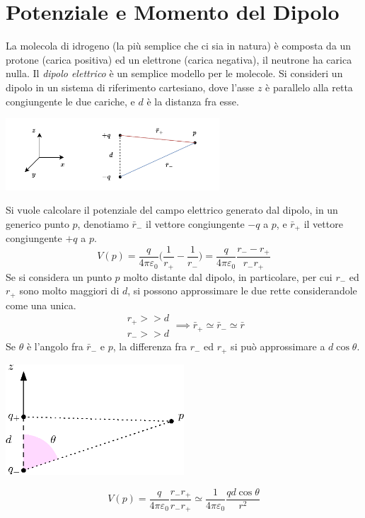\documentclass[10pt, letterpaper]{report}
\begin{document}
\flowerLine \section{Potenziale e Momento del Dipolo}
La molecola di idrogeno (la più semplice che ci sia in natura) è composta da un protone (carica positiva) ed un elettrone (carica negativa), il neutrone ha carica nulla. Il \textit{dipolo elettrico} è un semplice modello per le molecole. Si consideri un dipolo in un sistema di riferimento cartesiano, dove l'asse $z$ è parallelo alla retta congiungente le due cariche, e $d$ è la distanza fra esse. 
\begin{center}
    \includegraphics[width=0.6\textwidth]{images/dipoloAsse.drawio.pdf}
\end{center} 
Si vuole calcolare il potenziale del campo elettrico generato dal dipolo, in un generico punto $p$, denotiamo $\bar r_-$ il vettore congiungente $-q$ a $p$, e $\bar r_+$ il vettore congiungente $+q$ a $p$.
$$ V(p)=\frac{q}{4\pi\varepsilon_0}\Big( \frac{1}{r_+}-\frac{1}{r_-} \Big)=\frac{q}{4\pi\varepsilon_0}\frac{r_--r_+}{r_-r_+}$$
Se si considera un punto $p$ molto distante dal dipolo, in particolare, per cui $r_-$ ed $r_+$ sono molto maggiori di $d$, si possono approssimare le due rette considerandole come una unica. 
$$ \begin{matrix}
    r_+>>d\\ 
    r_->>d 
\end{matrix}\implies 
\bar  r_+\simeq \bar  r_- \simeq \bar  r$$
Se $\theta$ è l'angolo fra $\bar r_-$ e $p$, la differenza fra $r_-$ ed $r_+$ si può approssimare a $d\cos\theta$.
\begin{center}
    \includegraphics[width=0.5\textwidth]{images/dipoloAsse2.eps}
\end{center} 
$$ V(p)=\frac{q}{4\pi\varepsilon_0}\frac{r_-r_+}{r_-r_+} \simeq 
\frac{1}{4\pi\varepsilon_0}\frac{qd\cos\theta}{r^2}$$
\end{document}
